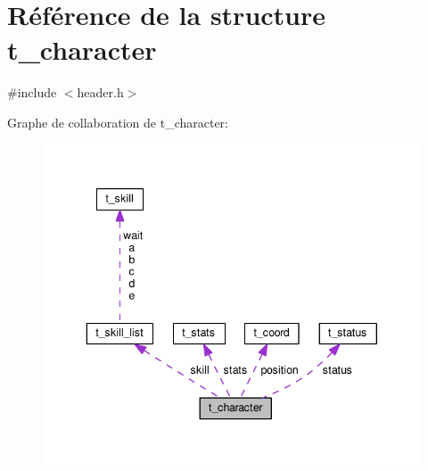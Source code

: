 \hypertarget{structt__character}{\section{Référence de la structure t\-\_\-character}
\label{structt__character}
}


{\ttfamily \#include $<$header.\-h$>$}



Graphe de collaboration de t\-\_\-character\-:\nopagebreak
\begin{figure}[H]
\begin{center}
\leavevmode
\includegraphics[width=343pt]{structt__character__coll__graph}
\end{center}
\end{figure}
